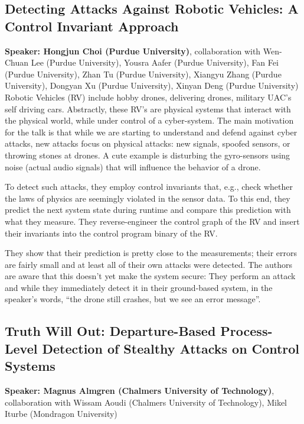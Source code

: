 \documentclass{article}
\begin{document}
\subsection{Detecting Attacks Against Robotic Vehicles: A Control Invariant Approach}
\noindent\textbf{Speaker: Hongjun Choi (Purdue University)}, collaboration with Wen-Chuan Lee (Purdue University), Yousra Aafer (Purdue University), Fan Fei (Purdue University), Zhan Tu (Purdue University), Xiangyu Zhang (Purdue University), Dongyan Xu (Purdue University), Xinyan Deng (Purdue University)\\

Robotic Vehicles (RV) include hobby drones, delivering drones, military UAC's self driving cars. Abstractly, these RV's are physical systems that interact with the physical world, while under control of a cyber-system. The main motivation for the talk is that while we are starting to understand and defend against cyber attacks, new attacks focus on physical attacks: new signals, spoofed sensors, or throwing stones at drones. A cute example is disturbing the gyro-sensors using noise (actual audio signals) that will influence the behavior of a drone.

To detect such attacks, they employ control invariants that, e.g., check whether the laws of physics are seemingly violated in the sensor data. To this end, they predict the next system state during runtime and compare this prediction with what they measure. They reverse-engineer the control graph of the RV and insert their invariants into the control program binary of the RV.

They show that their prediction is pretty close to the measurements; their errors are fairly small and at least all of their own attacks were detected. The authors are aware that this doesn't yet make the system secure: They perform an attack and while they immediately detect it in their ground-based system, in the speaker's words, ``the drone still crashes, but we see an error message''.

\subsection{Truth Will Out: Departure-Based Process-Level Detection of Stealthy Attacks on Control Systems}
\noindent\textbf{Speaker: Magnus Almgren (Chalmers University of Technology)}, collaboration with Wissam Aoudi (Chalmers University of Technology), Mikel Iturbe (Mondragon University)\\
\end{document}
